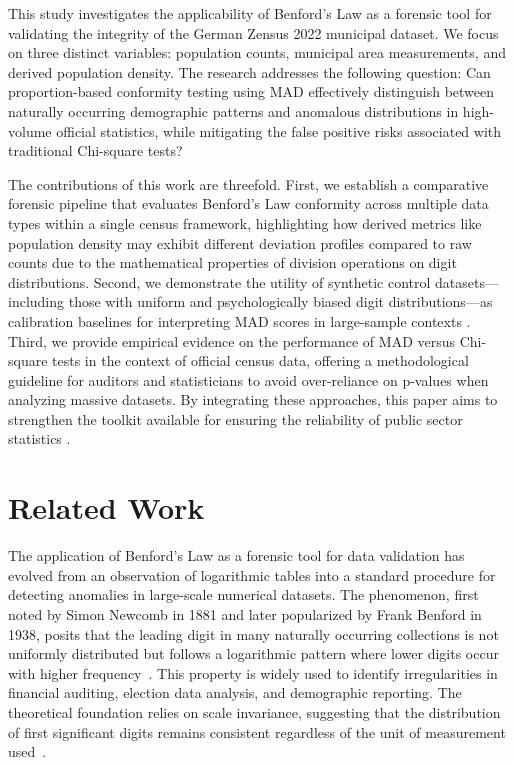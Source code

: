 \documentclass[11pt,a4paper]{article}
\begin{document}
This study investigates the applicability of Benford's Law as a forensic tool for validating the integrity of the German Zensus 2022 municipal dataset. We focus on three distinct variables: population counts, municipal area measurements, and derived population density. The research addresses the following question: Can proportion-based conformity testing using MAD effectively distinguish between naturally occurring demographic patterns and anomalous distributions in high-volume official statistics, while mitigating the false positive risks associated with traditional Chi-square tests?

The contributions of this work are threefold. First, we establish a comparative forensic pipeline that evaluates Benford's Law conformity across multiple data types within a single census framework, highlighting how derived metrics like population density may exhibit different deviation profiles compared to raw counts due to the mathematical properties of division operations on digit distributions. Second, we demonstrate the utility of synthetic control datasets---including those with uniform and psychologically biased digit distributions---as calibration baselines for interpreting MAD scores in large-sample contexts \cite{Cole2019TestingTE}. Third, we provide empirical evidence on the performance of MAD versus Chi-square tests in the context of official census data, offering a methodological guideline for auditors and statisticians to avoid over-reliance on p-values when analyzing massive datasets. By integrating these approaches, this paper aims to strengthen the toolkit available for ensuring the reliability of public sector statistics \cite{Jianu2021ReliabilityOF}.

\section{Related Work}
The application of Benford's Law as a forensic tool for data validation has evolved from an observation of logarithmic tables into a standard procedure for detecting anomalies in large-scale numerical datasets. The phenomenon, first noted by Simon Newcomb in 1881 and later popularized by Frank Benford in 1938, posits that the leading digit in many naturally occurring collections is not uniformly distributed but follows a logarithmic pattern where lower digits occur with higher frequency~\cite{Kossler2024SomeNI,Cole2019TestingTE}. This property is widely used to identify irregularities in financial auditing, election data analysis, and demographic reporting. The theoretical foundation relies on scale invariance, suggesting that the distribution of first significant digits remains consistent regardless of the unit of measurement used~\cite{Petras2025DetectingBL}.
\end{document}

